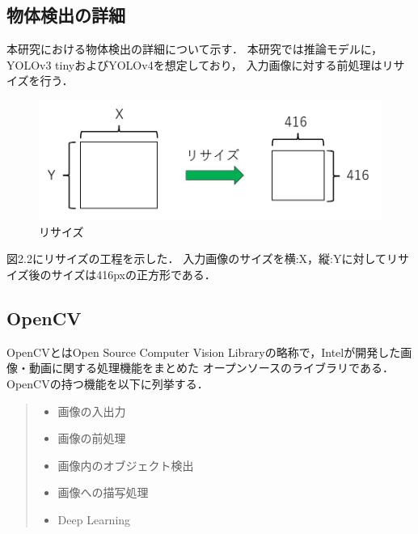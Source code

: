 \documentclass[11pt,a4j]{jreport}
\begin{document}
\subsection{物体検出の詳細}
本研究における物体検出の詳細について示す．
本研究では推論モデルに，YOLOv3 tinyおよびYOLOv4を想定しており，
入力画像に対する前処理はリサイズを行う．
\begin{figure}[H]
  \center
  \includegraphics[scale = 0.8]{pict/pict5.jpg}
  \caption{リサイズ}
\end{figure}
図2.2にリサイズの工程を示した．
入力画像のサイズを横:X，縦:Yに対してリサイズ後のサイズは416pxの正方形である．


\subsection{OpenCV}
OpenCVとはOpen Source Computer Vision Libraryの略称で，Intelが開発した画像・動画に関する処理機能をまとめた
オープンソースのライブラリである．OpenCVの持つ機能\cite{OpenCV}を以下に列挙する．
\begin{quote}
  \begin{itemize}
    \item 画像の入出力
    \item 画像の前処理
    \item 画像内のオブジェクト検出
    \item 画像への描写処理
    \item Deep Learning
  \end{itemize}
\end{quote}
\end{document}
